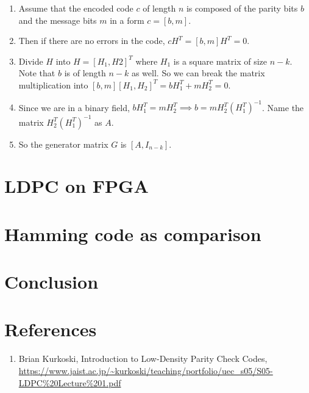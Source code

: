 \documentclass[letterpaper,12pt,oneside]{article}
\begin{document}
\begin{enumerate}
    \item Assume that the encoded code $c$ of length $n$ is composed of the parity bits $b$ and the message bits $m$ in a form $c = [b, m]$.
    \item Then if there are no errors in the code, $cH^T = [b, m]H^T = 0$.
    \item Divide $H$ into $H = [H_1, H2]^T$ where $H_1$ is a square matrix of size $n-k$. Note that $b$ is of length $n-k$ as well. So we can break the matrix multiplication into $[b, m][H_1, H_2]^T = bH_1^T + mH_2^T = 0$.
    \item Since we are in a binary field, $bH_1^T = mH_2^T \implies b = mH_2^T(H_1^T)^{-1}$. Name the matrix $H_2^T(H_1^T)^{-1}$ as $A$.
    \item So the generator matrix $G$ is $[A, I_{n-k}]$.
\end{enumerate}
\section{LDPC on FPGA}
\section{Hamming code as comparison}
\section{Conclusion}
\section{References}
\begin{enumerate}
    \item \label{[1]} Brian Kurkoski, Introduction to Low-Density Parity Check Codes, \url{https://www.jaist.ac.jp/~kurkoski/teaching/portfolio/uec_s05/S05-LDPC%20Lecture%201.pdf}
\end{enumerate}
\end{document}
